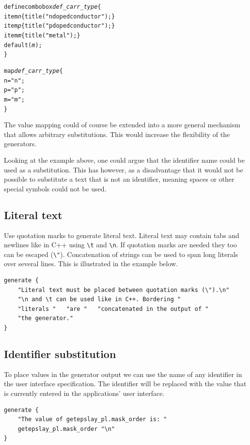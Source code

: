 \begin{alltt}
define combobox \emph{def_carr_type} \{
    item \emph{n} \{ title("n doped conductor"); \}
    item \emph{p} \{ title("p doped conductor"); \}
    item \emph{m} \{ title("metal"); \}
    default(\emph{m});
\}

map \emph{def_carr_type} \{
    n = "n";
    p = "p";
    m = "m";
\}
\end{alltt}

The value mapping could of course be extended into a more general mechanism
that allows arbitrary substitutions. This would increase the flexibility of the
generators.

Looking at the example above, one could argue that the identifier name could be
used as a substitution. This has however, as a disadvantage that it would not
be possible to substitute a text that is not an identifier, meaning spaces or
other special symbols could not be used.

\subsection{Literal text}
Use quotation marks to generate literal text. Literal text may contain tabs and
newlines like in C++ using \verb=\t= and \verb=\n=. If quotation marks are
needed they too can be escaped (\verb=\"=). Concatenation of strings can be
used to span long literals over several lines. This is illustrated in the
example below.

\begin{verbatim}
generate {
    "Literal text must be placed between quotation marks (\").\n"
    "\n and \t can be used like in C++. Bordering "
    "literals "   "are "   "concatenated in the output of "
    "the generator."
}
\end{verbatim}

\subsection{Identifier substitution}
To place values in the generator output we can use the name of any identifier
in the user interface specification. The identifier will be replaced with the
value that is currently entered in the applications' user interface.

\begin{verbatim}
generate {
    "The value of getepslay_pl.mask_order is: "
    getepslay_pl.mask_order "\n"
}
\end{verbatim}

